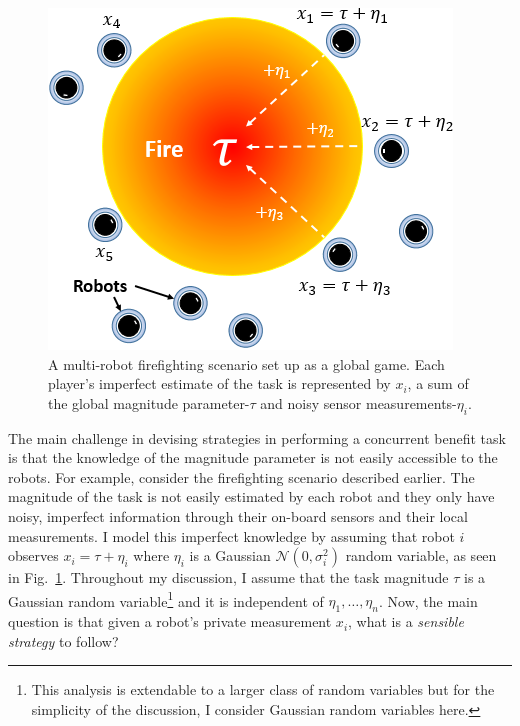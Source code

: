 \documentclass[defaultstyle,12pt]{thesis}
\begin{document}
\begin{figure}[!htb]
\centering\includegraphics[width=0.65\columnwidth]{../assets/globalgamesetup.png}
\centering\caption{A multi-robot firefighting scenario set up as a global game. Each player's imperfect estimate of the task is represented by $x_i$, a sum of the global magnitude parameter-$\tau$ and noisy sensor measurements-$\eta_i$.}\vspace{-10px}\label{fig:ggsetup}
\end{figure}

The main challenge in devising strategies in performing a concurrent benefit task is that the knowledge of the magnitude parameter is not easily accessible to the robots. For example, consider the firefighting scenario described earlier. The magnitude of the task is not easily estimated by each robot and they only have noisy, imperfect information through their on-board sensors and their local measurements.  I model this imperfect knowledge by assuming that robot $i$ observes $x_i=\tau+\eta_i$ where $\eta_i$ is a Gaussian $\mathcal{N}(0,\sigma_i^2)$ random variable, as seen in Fig.~\ref{fig:ggsetup}. Throughout my discussion, I assume that the task magnitude $\tau$ is a Gaussian random variable\footnote{This analysis is extendable to a larger class of random variables but for the simplicity of the discussion, I consider Gaussian random variables here.} and it is independent of $\eta_1,\ldots,\eta_n$. Now, the main question is that given a robot's private measurement $x_i$, what is a \emph{sensible strategy} to follow?
\end{document}
